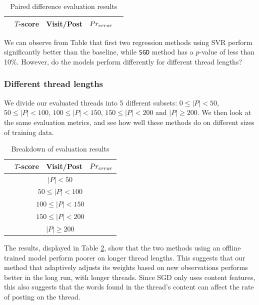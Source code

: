 \begin{table}
\begin{center}
	\footnotesize
\begin{tabular}{| l | c | c | c | l |}
\hline
& $T$-score			   &	Visit/Post & 	$Pr_{error}$ &\\
\hline
	
\hline
\end{tabular}
\end{center}
\caption{Paired difference evaluation results}\label{tbl:diff_eval}
\end{table}

We can observe from Table \label{tbl:diff_eval} that first two regression 
methods using SVR perform significantly better than the baseline, while 
\texttt{SGD} method has a $p$-value of less than 10\%. However, do the models 
perform differently for different thread lengths?

\subsubsection{Different thread lengths}
We divide our evaluated threads into 5 different subsets: $0 \leq |P| < 50$,
$50 \leq |P| < 100$, $100 \leq |P| < 150$, $150 \leq |P| < 200$ and $|P| \geq 
200$. We then look at the same evaluation metrics, and see how well these 
methods do on different sizes of training data.

\begin{table}
	\footnotesize
\begin{center}
\begin{tabular}{| l | c | c | c|}
\hline
& $T$-score			   &	Visit/Post & 	$Pr_{error}$ \\
\hline
	\multicolumn{4}{|c|}{$|P| < 50$}\\
\hline
	
\hline
	\multicolumn{4}{|c|}{$50 \leq |P| < 100$}\\
\hline
	
\hline
	\multicolumn{4}{|c|}{$100 \leq |P| < 150$}\\
\hline
	
\hline
	\multicolumn{4}{|c|}{$150 \leq |P| < 200$}\\
\hline
	
\hline
	\multicolumn{4}{|c|}{$|P| \geq 200$}\\
\hline
	
\hline
\end{tabular}
\end{center}
\caption{Breakdown of evaluation results}\label{tbl:bin_eval}
\end{table}
The results, displayed in Table \ref{tbl:bin_eval}, show that the two methods 
using an offline trained model perform poorer on longer thread lengths. This 
suggests that our method that adaptively adjusts its weights based on new 
observations performs better in the long run, with longer threads. Since SGD 
only uses content features, this also suggests that the words found in the 
thread's content can affect the rate of posting on the thread.

